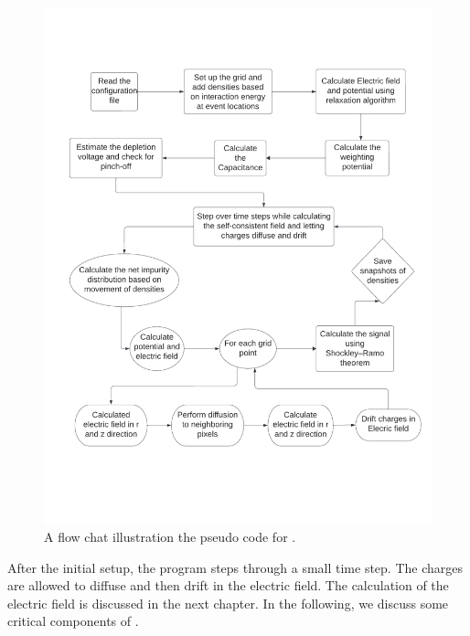 \begin{figure}[!htb]
\centering
\includegraphics[width=0.99\linewidth,trim={2pc 10pc 1.5pc 9pc},clip]{ch3/figs/ehd_flowchart.pdf}
\caption{A flow chat illustration the pseudo code for {\ehd}.}
\label{fig:ehd_flowchart}
\end{figure}


After the initial setup, the program steps through a small time step. The charges are allowed to diffuse and then drift in the electric field. The calculation of the electric field is discussed in the next chapter. In the following, we discuss some critical components of {\ehd}.


